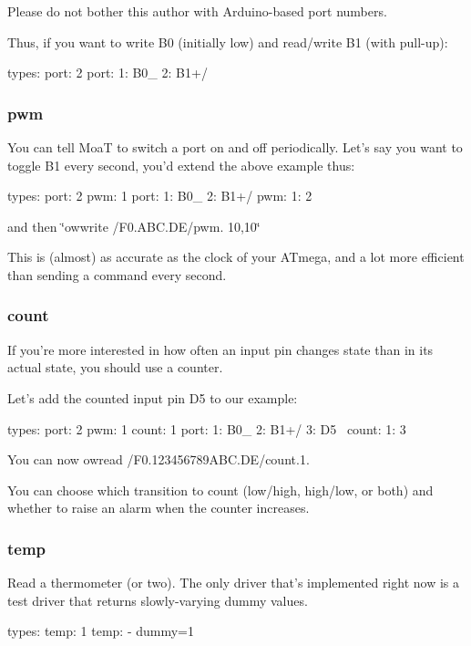 Please do not bother this author with Arduino-\/based port numbers.

Thus, if you want to write B0 (initially low) and read/write B1 (with pull-\/up)\-: \begin{DoxyVerb}types:
  port: 2
port:
  1: B0_
  2: B1+/
\end{DoxyVerb}


\subsubsection*{pwm}

You can tell Moa\-T to switch a port on and off periodically. Let's say you want to toggle B1 every second, you'd extend the above example thus\-: \begin{DoxyVerb}types:
  port: 2
  pwm: 1
port:
  1: B0_
  2: B1+/
pwm:
  1: 2
\end{DoxyVerb}


and then \char`\"{}owwrite /\-F0.\-A\-B\-C.\-D\-E/pwm. 10,10\char`\"{}

This is (almost) as accurate as the clock of your A\-Tmega, and a lot more efficient than sending a command every second.

\subsubsection*{count}

If you're more interested in how often an input pin changes state than in its actual state, you should use a counter.

Let's add the counted input pin D5 to our example\-: \begin{DoxyVerb}types:
  port: 2
  pwm: 1
  count: 1
port:
  1: B0_
  2: B1+/
  3: D5~
count:
  1: 3
\end{DoxyVerb}


You can now {\ttfamily owread /\-F0.123456789\-A\-B\-C.\-D\-E/count.1}.

You can choose which transition to count (low/high, high/low, or both) and whether to raise an alarm when the counter increases.

\subsubsection*{temp}

Read a thermometer (or two). The only driver that's implemented right now is a test driver that returns slowly-\/varying dummy values. \begin{DoxyVerb}types:
  temp: 1
temp:
  - dummy=1
\end{DoxyVerb}


